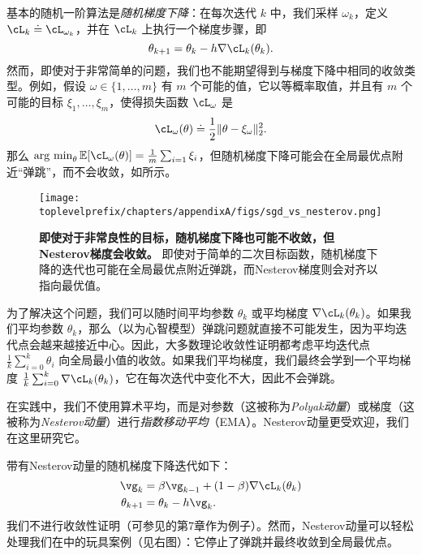 \documentclass[../../book-main.tex]{subfiles}
\begin{document}
基本的随机一阶算法是\textit{随机梯度下降}：在每次迭代 \(k\) 中，我们采样 \(\omega_{k}\)，定义 \(\cL_{k} \doteq \cL_{\omega_{k}}\)，并在 \(\cL_{k}\) 上执行一个梯度步骤，即
\begin{equation}
    \theta_{k + 1} = \theta_{k} - h\nabla \cL_{k}(\theta_{k}).
\end{equation}
然而，即使对于非常简单的问题，我们也不能期望得到与梯度下降中相同的收敛类型。例如，假设 \(\omega \in \{1, \dots, m\}\) 有 \(m\) 个可能的值，它以等概率取值，并且有 \(m\) 个可能的目标 \(\xi_{1}, \dots, \xi_{m}\)，使得损失函数 \(\cL_{\omega}\) 是
\begin{equation}
    \cL_{\omega}(\theta) \doteq \frac{1}{2}\norm{\theta - \xi_{\omega}}_{2}^{2}.
\end{equation}
那么 \(\argmin_{\theta}\Ex[\cL_{\omega}(\theta)] = \frac{1}{m}\sum_{i = 1}\xi_{i}\)，但随机梯度下降可能会在全局最优点附近“弹跳”，而不会收敛，如所示。

\begin{figure}
    \texttt{[image: \\toplevelprefix/chapters/appendixA/figs/sgd\_vs\_nesterov.png]}
    \centering 
    \caption{\small\textbf{即使对于非常良性的目标，随机梯度下降也可能不收敛，但Nesterov梯度会收敛。} 即使对于简单的二次目标函数，随机梯度下降的迭代也可能在全局最优点附近弹跳，而Nesterov梯度则会对齐以指向最优值。}
    \label{fig:sgd_nonconvergence}
\end{figure}

为了解决这个问题，我们可以随时间平均参数 \(\theta_{k}\) 或平均梯度 \(\nabla \cL_{k}(\theta_{k})\)。如果我们平均参数 \(\theta_{k}\)，那么（以为心智模型）弹跳问题就直接不可能发生，因为平均迭代点会越来越接近中心。因此，大多数理论收敛性证明都考虑平均迭代点 \(\frac{1}{k}\sum_{i = 0}^{k}\theta_{i}\) 向全局最小值的收敛。如果我们平均梯度，我们最终会学到一个平均梯度 \(\frac{1}{k}\sum_{i = 0}^{k}\nabla \cL_{k}(\theta_{k})\)，它在每次迭代中变化不大，因此不会弹跳。

在实践中，我们不使用算术平均，而是对参数（这被称为\textit{Polyak动量}）或梯度（这被称为\textit{Nesterov动量}）进行\textit{指数移动平均}（EMA）。Nesterov动量更受欢迎，我们在这里研究它。

带有Nesterov动量的随机梯度下降迭代如下：
\begin{align}
    \vg_{k}
    &= \beta\vg_{k - 1} + (1 - \beta)\nabla \cL_{k}(\theta_{k}) \\ 
    \theta_{k + 1}
    &= \theta_{k} - h\vg_{k}.
\end{align}
我们不进行收敛性证明（可参见\cite{garrigos2023handbook}的第7章作为例子）。然而，Nesterov动量可以轻松处理我们在中的玩具案例（见右图）：它停止了弹跳并最终收敛到全局最优点。
\end{document}
